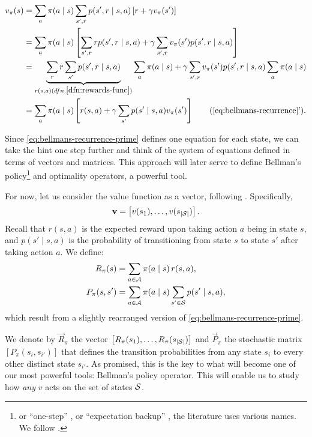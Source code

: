 \begin{align}
\label{eq:bellmans-recurrence-prime}
v_\pi(s) &= \sum_{a} \pi(a \mid s) \sum_{s', r} p(s', r \mid s, a) \left[ r + \gamma v_\pi (s') \right] \nonumber \\
&= \sum_{a} \pi(a \mid s) \left[ \sum_{s', r} r p(s', r \mid s, a) + \gamma \sum_{s', r} v_\pi (s') p(s', r \mid s,a) \right] \nonumber \\
&= \underbrace{\sum_{r} r \sum_{s'} p(s', r \mid s, a)}_{r(s,a) (dfn. \ref{dfn:rewards-func})} \sum_a \pi(a \mid s) + \gamma \sum_{s', r} v_\pi (s') p(s', r \mid s, a) \sum_{a} \pi(a \mid s) \nonumber \\
&= \sum_{a} \pi(a \mid s) \left[ r(s,a) + \gamma \sum_{s'} p(s' \mid s, a) v_\pi (s') \right] \tag{\ref{eq:bellmans-recurrence}'}.
\end{align}

Since \eqref{eq:bellmans-recurrence-prime} defines one equation for each state,
we can take the hint one step further and think of the system of equations
defined in terms of vectors and matrices. This approach will later serve to
define Bellman's policy\footnote{or ``one-step'' \cite[pg.~9]{nadeemward2021},
or ``expectation backup'' \cite[Lect.~3, Contraction Mapping]{silver2015}, the
literature uses various names. We follow \cite{raoRL4F}.} and optimality
operators, a powerful tool.

For now, let us consider the value function as a vector, following
\cite[pg.~132]{raoRL4F}. Specifically,
\begin{equation*}
    \mathbf{v} = \left[ v (s_1), \dots , v (s_{|\mathcal{S}|}) \right].
\end{equation*}
Recall that $r(s, a)$ is the expected reward upon taking action $a$ being in
state $s$, and $p(s' \mid s, a)$ is the probability of transitioning from state
$s$ to state $s'$ after taking action $a$. We define:
\begin{align*}
    R_\pi (s) &= \sum_{a \in \mathcal{A}} \pi(a \mid s) \, r(s,a), \\
    P_\pi (s, s') &= \sum_{a \in \mathcal{A}} \pi(a \mid s) \sum_{s' \in \mathcal{S}} p(s' \mid s, a),
\end{align*}
which result from a slightly rearranged version of
\eqref{eq:bellmans-recurrence-prime}.

We denote by $\vec{R}_\pi$ the vector $\left[ R_\pi(s_1), \dots, R_\pi
(s_{|\mathcal{S}|}) \right]$ and $\vec{P}_\pi$ the stochastic matrix $\left[
P_\pi(s_i, s_{i'}) \right]$ that defines the transition probabilities from any
state $s_i$ to every other distinct state $s_{i'}$. As promised, this is the key
to what will become one of our most powerful tools: Bellman's policy operator.
This will enable us to study how \textit{any} $v$ acts on the set of states
$\mathcal{S}$.

